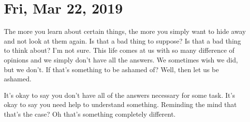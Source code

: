 \section{Fri, Mar 22, 2019}

The more you learn about certain things, the more you simply want to hide away 
and not look at them again. Is that a bad thing to suppose? Is that a bad thing 
to think about? I'm not sure. This life comes at us with so many difference of 
opinions and we simply don't have all the answers. We sometimes wish we did, but 
we don't. If that's something to be ashamed of? Well, then let us be ashamed.

It's okay to say you don't have all of the answers necessary for some task. It's 
okay to say you need help to understand something. Reminding the mind that 
that's the case? Oh that's something completely different.
